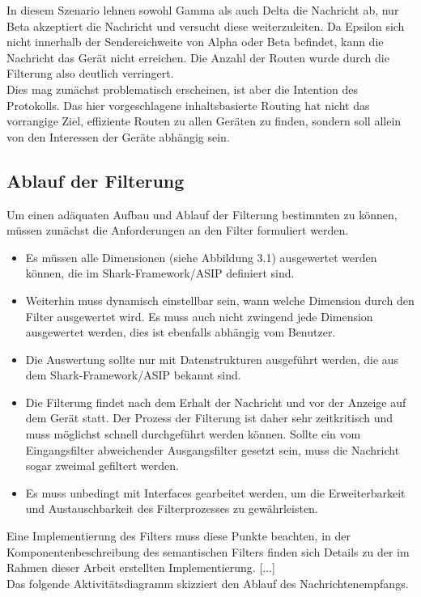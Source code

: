 In diesem Szenario lehnen sowohl Gamma als auch Delta die Nachricht ab, nur Beta akzeptiert die Nachricht und versucht diese weiterzuleiten. Da Epsilon sich nicht innerhalb der Sendereichweite von Alpha oder Beta befindet, kann die Nachricht das Gerät nicht erreichen. Die Anzahl der Routen wurde durch die Filterung also deutlich verringert. 
\\Dies mag zunächst problematisch erscheinen, ist aber die Intention des Protokolls. Das hier vorgeschlagene inhaltsbasierte Routing hat nicht das vorrangige Ziel, effiziente Routen zu allen Geräten zu finden, sondern soll allein von den Interessen der Geräte abhängig sein. 

\subsection{Ablauf der Filterung}
Um einen adäquaten Aufbau und Ablauf der Filterung bestimmten zu können, müssen zunächst die Anforderungen an den Filter formuliert werden.
\begin{itemize}
	\item Es müssen alle Dimensionen (siehe Abbildung 3.1) ausgewertet werden können, die im Shark-Framework/ASIP definiert sind.
	\item Weiterhin muss dynamisch einstellbar sein, wann welche Dimension durch den Filter ausgewertet wird. Es muss auch nicht zwingend jede Dimension ausgewertet werden, dies ist ebenfalls abhängig vom Benutzer.
	\item Die Auswertung sollte nur mit Datenstrukturen ausgeführt werden, die aus dem Shark-Framework/ASIP bekannt sind.
	\item Die Filterung findet nach dem Erhalt der Nachricht und vor der Anzeige auf dem Gerät statt. Der Prozess der Filterung ist daher sehr zeitkritisch und muss möglichst schnell durchgeführt werden können. Sollte ein vom Eingangsfilter abweichender Ausgangsfilter gesetzt sein, muss die Nachricht sogar zweimal gefiltert werden.
	\item Es muss unbedingt mit Interfaces gearbeitet werden, um die Erweiterbarkeit und Austauschbarkeit des Filterprozesses zu gewährleisten.
\end{itemize}
Eine Implementierung des Filters muss diese Punkte beachten, in der Komponentenbeschreibung des semantischen Filters finden sich Details zu der im Rahmen dieser Arbeit erstellten Implementierung. [...]
\\Das folgende Aktivitätsdiagramm skizziert den Ablauf des Nachrichtenempfangs.
